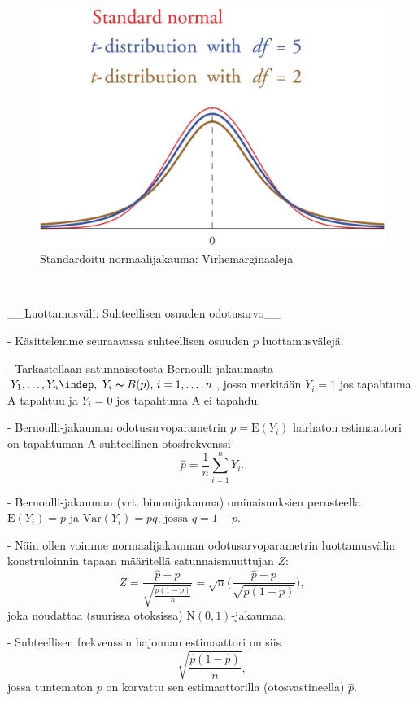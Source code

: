 \documentclass[
]{book}
\begin{document}
\begin{itemize}
\begin{figure}
\includegraphics[width=20.15in]{images/NjaT-jakauma} \caption{Standardoitu normaalijakauma: Virhemarginaaleja}\label{fig:unnamed-chunk-10}
\end{figure}

\
\
\
\

__Luottamusväli: Suhteellisen osuuden odotusarvo__

- Käsittelemme seuraavassa suhteellisen osuuden $p$ luottamusvälejä.

- Tarkastellaan satunnaisotosta Bernoulli-jakaumasta 
$Y_1, \ldots, Y_n \indep, \,\, Y_i \thicksim B(p),\, i=1,\ldots,n$,
jossa merkitään $Y_i=1$ jos tapahtuma A tapahtuu ja $Y_i=0$ jos tapahtuma A ei tapahdu.

- Bernoulli-jakauman odotusarvoparametrin $p=\text{E}(Y_i)$ harhaton estimaattori on tapahtuman A suhteellinen otosfrekvenssi
$$
\widehat{p} = \frac{1}{n} \sum_{i=1}^{n} Y_i.
$$

- Bernoulli-jakauman (vrt. binomijakauma) ominaisuuksien 
perusteella $\text{E}(Y_i)=p$ ja $\mathrm{Var}(Y_i)=pq$, jossa
$q=1-p$.

- Näin ollen voimme normaalijakauman odotusarvoparametrin
luottamusvälin konstruloinnin tapaan määritellä satunnaismuuttujan $Z$:
$$
Z = \frac{\widehat{p} - p}{\sqrt{\frac{p (1-p)}{n}}} = 
\sqrt{n} \Big(\frac{\widehat{p} - p}{\sqrt{p (1-p)}} \Big),  
$$
joka noudattaa (suurissa otoksissa) $\text{N}(0,1)$-jakaumaa.

- Suhteellisen frekvenssin hajonnan estimaattori on siis
$$
\sqrt{\frac{\widehat{p} (1-\widehat{p})}{n}},
$$
jossa tuntematon $p$ on korvattu sen estimaattorilla (otosvastineella) $\widehat{p}$.



\end{itemize}
\end{document}
